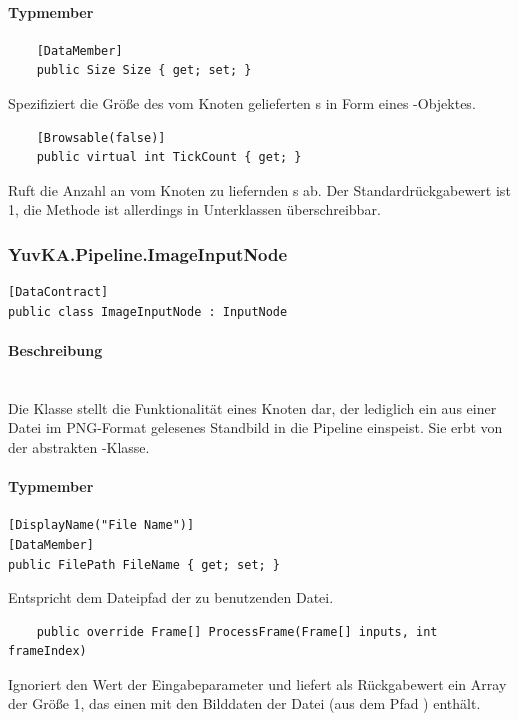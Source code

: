 \paragraph{Typmember}
\begin{itemize}

	\begin{verbatim}
	[DataMember]
	public Size Size { get; set; }
	\end{verbatim}
	Spezifiziert die Größe des vom Knoten gelieferten s in Form eines -Objektes.

	\begin{verbatim}
	[Browsable(false)]
	public virtual int TickCount { get; }
	\end{verbatim}
	Ruft die Anzahl an vom Knoten zu liefernden s ab. Der Standardrückgabewert ist 1, die Methode ist allerdings in Unterklassen überschreibbar.

\end{itemize}

\subsubsection{YuvKA.Pipeline.ImageInputNode}

\begin{verbatim}
[DataContract]
public class ImageInputNode : InputNode
\end{verbatim}

\paragraph{Beschreibung}~\\
Die Klasse  stellt die Funktionalität eines Knoten dar, der lediglich ein aus einer Datei im PNG-Format gelesenes Standbild in die Pipeline einspeist. Sie erbt von der abstrakten -Klasse.

\paragraph{Typmember}
\begin{itemize}

	\begin{verbatim}
[DisplayName("File Name")]
[DataMember]
public FilePath FileName { get; set; }
	\end{verbatim}
	Entspricht dem Dateipfad der zu benutzenden Datei.

	\begin{verbatim}
	public override Frame[] ProcessFrame(Frame[] inputs, int frameIndex)
	\end{verbatim}
	Ignoriert den Wert der Eingabeparameter und liefert als Rückgabewert ein Array der Größe 1, das einen  mit den Bilddaten der Datei (aus dem Pfad ) enthält.

\end{itemize}
